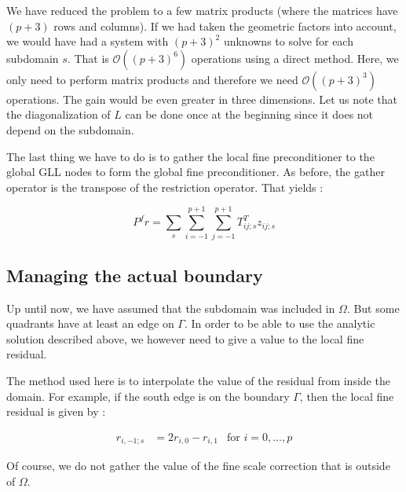 We have reduced the problem to a few matrix products (where the matrices have $(p+3)$ rows and columns). If we had taken the geometric factors into account, we would have had a system with $(p+3)^2$ unknowns to solve for each subdomain $s$. That is $\mathcal{O}((p+3)^6)$ operations using a direct method. Here, we only need to perform matrix products and therefore we need $\mathcal{O}((p+3)^3)$ operations. The gain would be even greater in three dimensions. Let us note that the diagonalization of $L$ can be done once at the beginning since it does not depend on the subdomain.

The last thing we have to do is to gather the local fine preconditioner to the global GLL nodes to form the global fine preconditioner. As before, the gather operator is the transpose of the restriction operator. That yields : 

$$ P^f r = \sum_s \sum_{i=-1}^{p+1}\sum_{j=-1}^{p+1} T^T_{ij;s} z_{ij;s}$$

\subsection{Managing the actual boundary}

Up until now, we have assumed that the subdomain was included in $\Omega$. But some quadrants have at least an edge on $\Gamma$. In order to be able to use the analytic solution described above, we however need to give a value to the local fine residual. 

The method used here is to interpolate the value of the residual from inside the domain. For example, if the south edge is on the boundary $\Gamma$, then the local fine residual is given by : 

\begin{align*}
r_{i,-1;s} &= 2r_{i,0} - r_{i,1} &\text{for $i=0,...,p$}
\end{align*}

Of course, we do not gather the value of the fine scale correction that is outside of $\Omega$.









